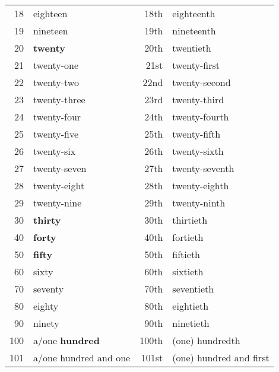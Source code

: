 \begin{table}[tp!]
\begin{tabular}[hp!]{rlrl}
    18        & eighteen                 & 18th        & eighteenth                 \\
    19        & nineteen                 & 19th        & nineteenth                 \\
    20        & \textbf{twenty}                & 20th        & twentieth                  \\
    21        & twenty-one               & 21st        & twenty-first               \\
    22        & twenty-two               & 22nd        & twenty-second              \\
    23        & twenty-three             & 23rd        & twenty-third               \\
    24        & twenty-four              & 24th        & twenty-fourth              \\
    25        & twenty-five              & 25th        & twenty-fifth               \\
    26        & twenty-six               & 26th        & twenty-sixth               \\
    27        & twenty-seven             & 27th        & twenty-seventh             \\
    28        & twenty-eight             & 28th        & twenty-eighth              \\
    29        & twenty-nine              & 29th        & twenty-ninth               \\
    30        & \textbf{thirty}                & 30th        & thirtieth                  \\
    40        & \textbf{forty}                 & 40th        & fortieth                   \\
    50        & \textbf{fifty}                 & 50th        & fiftieth                   \\
    60        & sixty                    & 60th        & sixtieth                   \\
    70        & seventy                  & 70th        & seventieth                 \\
    80        & eighty                   & 80th        & eightieth                  \\
    90        & ninety                   & 90th        & ninetieth                  \\
    100       & a/one \textbf{hundred}         & 100th       & (one) hundredth            \\
    101       & a/one hundred and one    & 101st       & (one) hundred and first    \\

\end{tabular}
\end{table}
